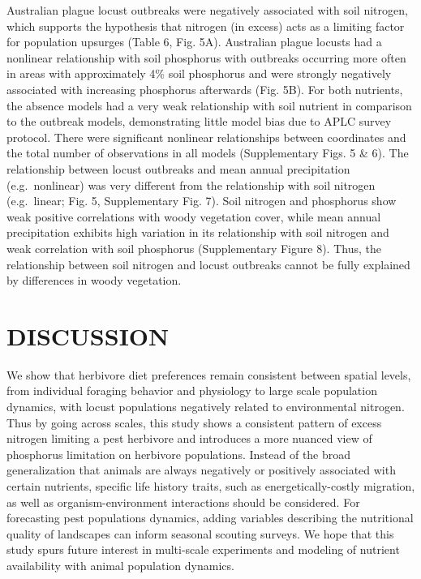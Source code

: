 \documentclass[
]{article}
\begin{document}
Australian plague locust outbreaks were negatively associated with soil
nitrogen, which supports the hypothesis that nitrogen (in excess) acts
as a limiting factor for population upsurges (Table 6, Fig. 5A).
Australian plague locusts had a nonlinear relationship with soil
phosphorus with outbreaks occurring more often in areas with
approximately 4\% soil phosphorus and were strongly negatively
associated with increasing phosphorus afterwards (Fig. 5B). For both
nutrients, the absence models had a very weak relationship with soil
nutrient in comparison to the outbreak models, demonstrating little
model bias due to APLC survey protocol. There were significant nonlinear
relationships between coordinates and the total number of observations
in all models (Supplementary Figs. 5 \& 6). The relationship between
locust outbreaks and mean annual precipitation (e.g.~nonlinear) was very
different from the relationship with soil nitrogen (e.g.~linear; Fig. 5,
Supplementary Fig. 7). Soil nitrogen and phosphorus show weak positive
correlations with woody vegetation cover, while mean annual
precipitation exhibits high variation in its relationship with soil
nitrogen and weak correlation with soil phosphorus (Supplementary Figure
8). Thus, the relationship between soil nitrogen and locust outbreaks
cannot be fully explained by differences in woody vegetation.

\section{DISCUSSION}\label{discussion}

We show that herbivore diet preferences remain consistent between
spatial levels, from individual foraging behavior and physiology to
large scale population dynamics, with locust populations negatively
related to environmental nitrogen. Thus by going across scales, this
study shows a consistent pattern of excess nitrogen limiting a pest
herbivore and introduces a more nuanced view of phosphorus limitation on
herbivore populations. Instead of the broad generalization that animals
are always negatively or positively associated with certain nutrients,
specific life history traits, such as energetically-costly migration, as
well as organism-environment interactions should be considered. For
forecasting pest populations dynamics, adding variables describing the
nutritional quality of landscapes can inform seasonal scouting surveys.
We hope that this study spurs future interest in multi-scale experiments
and modeling of nutrient availability with animal population dynamics.
\end{document}
